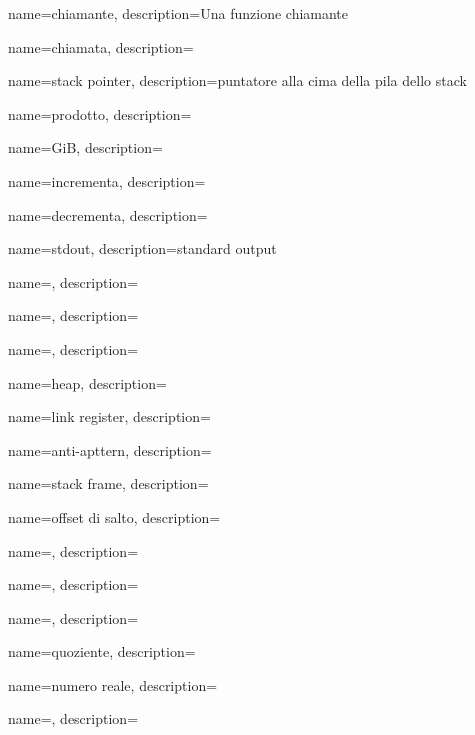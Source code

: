 {
  name=chiamante,
  description={Una funzione chiamante}
}

{
  name=chiamata,
  description={\ITph{}}
}

{
  name={stack pointer},
  description={puntatore alla cima della pila dello stack}
}

{
  name={prodotto},
  description={\ITph{}}
}

{
  name={GiB},
  description={\ITph{}}
}

{
  name={incrementa},
  description={\ITph{}}
}

{
  name={decrementa},
  description={\ITph{}}
}

{
  name={stdout},
  description={standard output}
}

{
  name={\ITph},
  description={\ITph{}}
}

{
  name={\ITph},
  description={\ITph{}}
}

{
  name={\ITph},
  description={\ITph{}}
}

{
  name={heap},
  description={\ITph{}}
}

{
  name={link register},
  description={\ITph{}}
}

{
  name={anti-apttern},
  description={\ITph{}}
}

{
  name={stack frame},
  description={\ITph{}}
}

{
  name={offset di salto},
  description={\ITph{}}
}

{
  name={\ITph},
  description={\ITph{}}
}

{
  name={\ITph},
  description={\ITph{}}
}

{
  name={\ITph},
  description={\ITph{}}
}

{
  name={quoziente},
  description={\ITph{}}
}

{
  name={numero reale},
  description={\ITph{}}
}

{
  name={\ITph},
  description={\ITph{}}
}

